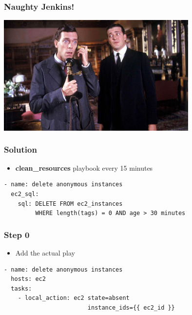 \documentclass{beamer}
\begin{document}
\begin{frame}\frametitle{Naughty Jenkins!}

    \begin{center}
        \includegraphics[width=10cm]{jeeves}
    \end{center}

\end{frame}


\begin{frame}[fragile]\frametitle{Solution}

    \begin{itemize}
        \item \textbf{clean\_resources} playbook every 15 minutes
    \end{itemize}

    \begin{lstlisting}
- name: delete anonymous instances
  ec2_sql:
    sql: DELETE FROM ec2_instances
         WHERE length(tags) = 0 AND age > 30 minutes
    \end{lstlisting}

\end{frame}


\begin{frame}[fragile]\frametitle{Step 0}

    \begin{itemize}
        \item Add the actual play
    \end{itemize}

    \begin{lstlisting}
- name: delete anonymous instances
  hosts: ec2
  tasks:
    - local_action: ec2 state=absent
                        instance_ids={{ ec2_id }}
    \end{lstlisting}

\end{frame}
\end{document}
